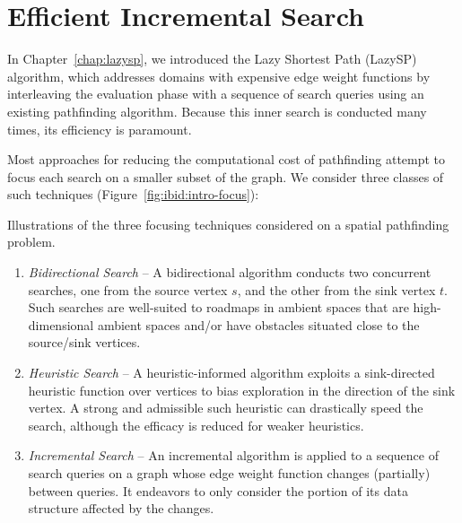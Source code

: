 \chapter{Efficient Incremental Search}
\label{chap:ibid}

In Chapter~\ref{chap:lazysp},
we introduced the Lazy Shortest Path (LazySP) algorithm,
which addresses domains with expensive edge weight functions
by interleaving the evaluation phase with a sequence of 
search queries using an existing pathfinding algorithm.
Because this inner search is conducted many times,
its efficiency is paramount.

Most approaches for reducing the computational cost of pathfinding
attempt to focus each search on a smaller subset of the graph.
We consider three classes of such techniques
(Figure~\ref{fig:ibid:intro-focus}):

\begin{marginfigure}[5cm]%
   \centering%
   
   
   
   \caption{Illustrations of the three focusing techniques considered
      on a spatial pathfinding problem.}%
   \label{fig:ibid:intro-focus}
\end{marginfigure}

\begin{enumerate}
\item \emph{Bidirectional Search} -- A bidirectional algorithm
   conducts two concurrent searches,
   one from the source vertex $s$,
   and the other from the sink vertex $t$.
   Such searches are well-suited to roadmaps in ambient spaces that
   are high-dimensional ambient spaces and/or have
   obstacles situated close to the source/sink vertices.
\item \emph{Heuristic Search} -- A heuristic-informed algorithm
   exploits a sink-directed heuristic function over vertices to bias
   exploration in the direction of the sink vertex.
   A strong and admissible such heuristic can drastically speed the
   search,
   although the efficacy is reduced for weaker heuristics.
\item \emph{Incremental Search} -- An incremental algorithm
   is applied to a sequence of search queries on a graph whose
   edge weight function changes (partially) between queries.
   It endeavors to only consider the portion of its data structure
   affected by the changes.
\end{enumerate}

